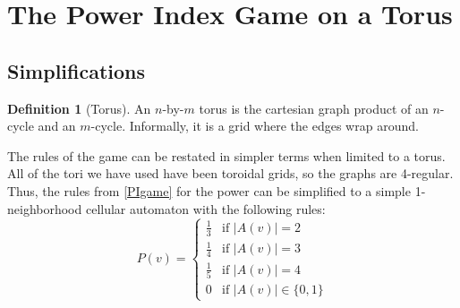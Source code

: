 \documentclass[12pt]{article}
\theoremstyle{definition}
\newtheorem{definition}{Definition}%
\theoremstyle{remark}
\theoremstyle{remark}
\begin{document}
\section{The Power Index Game on a Torus} \label{Main Chapter}
\subsection{Simplifications} \label{Simplification}
\begin{definition}[Torus]
An $n$-by-$m$ torus is the cartesian graph product of an $n$-cycle and an $m$-cycle. Informally, it is a grid where the edges wrap around.
\end{definition}

\par
The rules of the game can be restated in simpler terms when limited to a torus. All of the tori we have used have been toroidal grids, so the graphs are 4-regular. Thus, the rules from \ref{PIgame} for the power can be simplified to a simple 1-neighborhood cellular automaton with the following rules:
\begin{equation}
	\label{powerEq}
	P(v) =
	\begin{cases}
		\frac{1}{3} & \text{if $|A(v)|=2$} \\
		\frac{1}{4} & \text{if $|A(v)|=3$} \\
		\frac{1}{5} & \text{if $|A(v)|=4$} \\
		0 & \text{if $|A(v)|\in \{0,1\}$}
	\end{cases}
\end{equation}
\end{document}
